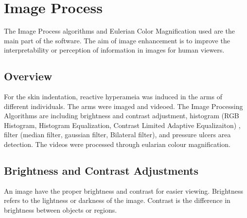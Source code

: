 \chapter{Image Process} \label{chapter:model}
The Image Process algorithms and Eulerian Color Magnification used are the main part of the software. The aim of image enhancement is to improve the interpretability or perception of information in images for human viewers.
  
\section{Overview}
For the skin indentation, reactive hyperameia was induced in the arms of different individuals. The arms were imaged and videoed. The Image Processing Algorithms are including brightness and contrast adjustment, histogram (RGB Histogram, Histogram Equalization, Contrast Limited Adaptive Equalizaiton) , filter (median filter, gaussian filter, Bilateral filter), and pressure ulcers area detection. The videos were processed through eularian colour magnification. 
    
\section{Brightness and Contrast Adjustments}
An image have the proper brightness and contrast for easier viewing. Brightness refers to the lightness or darkness of the image. Contrast is the difference in brightness between objects or regions.\\


